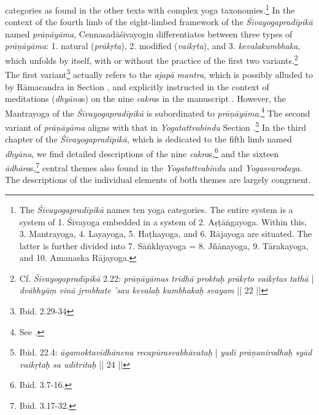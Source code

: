 categories as found in the other texts with complex yoga taxonomies.\footnote{The \textit{Śivayogapradīpikā} names ten yoga categories. The entire system is a system of 1. Śivayoga embedded in a system of 2. Aṣṭāṅgayoga. Within this, 3. Mantrayoga, 4. Layayoga, 5. Haṭhayoga, and 6. Rājayoga are situated. The latter is further divided into 7. Sāṅkhyayoga = 8. Jñānayoga, 9. Tārakayoga, and 10. Amanaska Rājayoga.}
In the context of the fourth limb of the eight-limbed framework of the \emph{Śivayogapradīpikā} named \textit{prāṇāyāma}, Cennasadāśivayogin differentiates between three types of \textit{prāṇāyāma}: 1. natural (\textit{prākṛta}), 2. modified (\textit{vaikṛta}), and 3. \textit{kevalakumbhaka}, which unfolds by itself, with or without the practice of the first two variants.\footnote{Cf. \textit{Śivayogapradīpikā} 2.22: \textit{prāṇāyāmas tridhā proktaḥ prākṛto vaikṛtas tathā} | \textit{dvābhyāṃ vinā jṛmbhate 'sau kevalaḥ kumbhakaḥ svayam} || 22 ||} The first variant\footnote{Ibid. 2.29-34} actually refers to the \textit{ajapā mantra}, which is possibly alluded to by Rāmacandra in Section , and explicitly instructed in the context of meditations (\textit{dhyāna}s) on the nine \textit{cakra}s in the manuscript . However, the Mantrayoga of the \textit{Śivayogapradīpikā} is subordinated to \textit{prāṇāyāma}.\footnote{See \citeauthor[2023: 205]{powell2023}.} The second variant of \textit{prāṇāyāma} aligns with that in \textit{Yogatattvabindu} Section .\footnote{Ibid. 22.4: \textit{āgamoktavidhānena recapūrasvabhāvataḥ} | \textit{yadi prāṇanirodhaḥ syād vaikṛtaḥ sa udītritaḥ} || 24 ||} In the third chapter of the \textit{Śivayogapradīpikā}, which is dedicated to the fifth limb named \textit{dhyāna}, we find detailed descriptions of the nine \textit{cakra}s,\footnote{Ibid. 3.7-16.} and the sixteen \textit{ādhāra}s,\footnote{Ibid. 3.17-32.} central themes also found in the \textit{Yogatattvabindu} and \textit{Yogasvarodaya}. The descriptions of the individual elements of both themes are largely congruent.

